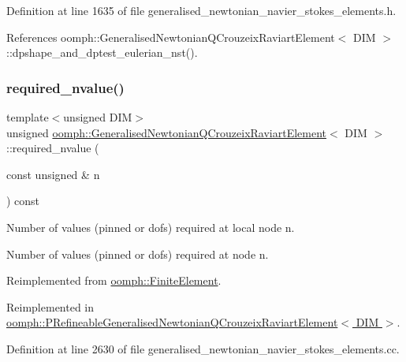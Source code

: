 Definition at line 1635 of file generalised\+\_\+newtonian\+\_\+navier\+\_\+stokes\+\_\+elements.\+h.



References oomph\+::\+Generalised\+Newtonian\+Q\+Crouzeix\+Raviart\+Element$<$ D\+I\+M $>$\+::dpshape\+\_\+and\+\_\+dptest\+\_\+eulerian\+\_\+nst().

\mbox{\label{classoomph_1_1GeneralisedNewtonianQCrouzeixRaviartElement_aaa3786b1a111c82a5ee7ee47e8e45eb0}} 
\subsubsection{\texorpdfstring{required\+\_\+nvalue()}{required\_nvalue()}}
{\footnotesize\ttfamily template$<$unsigned D\+IM$>$ \\
unsigned \hyperlink{classoomph_1_1GeneralisedNewtonianQCrouzeixRaviartElement}{oomph\+::\+Generalised\+Newtonian\+Q\+Crouzeix\+Raviart\+Element}$<$ D\+IM $>$\+::required\+\_\+nvalue (\begin{DoxyParamCaption}\item[{const unsigned \&}]{n }\end{DoxyParamCaption}) const\hspace{0.3cm}{\ttfamily [virtual]}}



Number of values (pinned or dofs) required at local node n. 

Number of values (pinned or dofs) required at node n. 

Reimplemented from \hyperlink{classoomph_1_1FiniteElement_a56610c60d5bc2d7c27407a1455471b1a}{oomph\+::\+Finite\+Element}.



Reimplemented in \hyperlink{classoomph_1_1PRefineableGeneralisedNewtonianQCrouzeixRaviartElement_a84706eee87eeaf48a3fe4b30c413aacd}{oomph\+::\+P\+Refineable\+Generalised\+Newtonian\+Q\+Crouzeix\+Raviart\+Element$<$ D\+I\+M $>$}.



Definition at line 2630 of file generalised\+\_\+newtonian\+\_\+navier\+\_\+stokes\+\_\+elements.\+cc.



